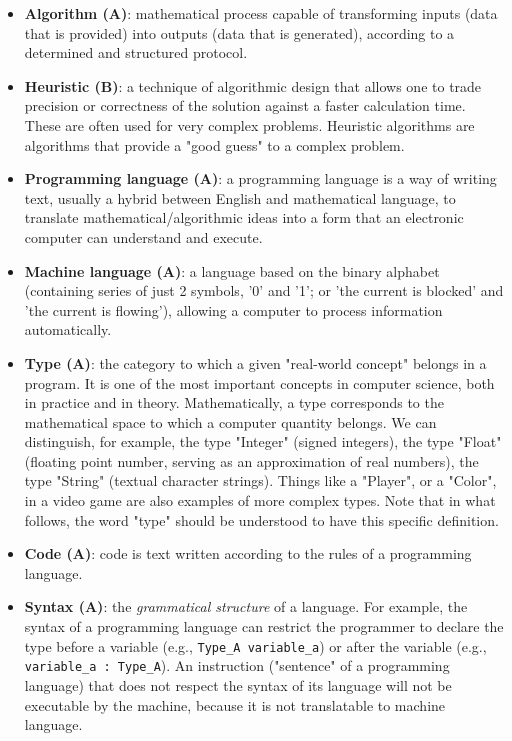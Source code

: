 \documentclass{article}
\begin{document}
\begin{itemize}
    \item \textbf{Algorithm (A)}: mathematical process capable of transforming inputs (data that is provided) into outputs (data that is generated), according to a determined and structured protocol.
    
    \item \textbf{Heuristic (B)}: a technique of algorithmic design that allows one to trade precision or correctness of the solution against a faster calculation time. These are often used for very complex problems. Heuristic algorithms are algorithms that provide a "good guess" to a complex problem.
    
    \item \textbf{Programming language (A)}: a programming language is a way of writing text, usually a hybrid between English and mathematical language, to translate mathematical/algorithmic ideas into a form that an electronic computer can understand and execute.
    
    \item \textbf{Machine language (A)}: a language based on the binary alphabet (containing series of just 2 symbols, '0' and '1'; or 'the current is blocked' and 'the current is flowing'), allowing a computer to process information automatically.
    
    \item \textbf{Type (A)}: the category to which a given "real-world concept" belongs in a program. It is one of the most important concepts in computer science, both in practice and in theory. Mathematically, a type corresponds to the mathematical space to which a computer quantity belongs. We can distinguish, for example, the type "Integer" (signed integers), the type "Float" (floating point number, serving as an approximation of real numbers), the type "String" (textual character strings). Things like a "Player", or a "Color", in a video game are also examples of more complex types. Note that in what follows, the word "type" should be understood to have this specific definition.
    
    \item \textbf{Code (A)}: code is text written according to the rules of a programming language.
    
    \item \textbf{Syntax (A)}: the \textit{grammatical structure} of a language. For example, the syntax of a programming language can restrict the programmer to declare the type before a variable (e.g., \texttt{Type\_A variable\_a}) or after the variable (e.g., \texttt{variable\_a : Type\_A}). An instruction ("sentence" of a programming language) that does not respect the syntax of its language will not be executable by the machine, because it is not translatable to machine language.
    

\end{itemize}
\end{document}
